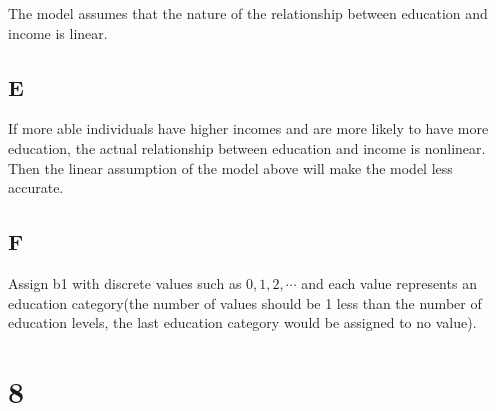 \documentclass{article}
\begin{document}
The model assumes that the nature of the relationship
between education and income is linear.

\subsection*{E}

If more able individuals have higher incomes and are more likely
to have more education, the actual relationship between education and income is nonlinear. Then the linear assumption of the model above will make the model less accurate.

\subsection*{F}

Assign b1 with discrete values such as $0,1,2,\cdots$ and each value represents an education category(the number of values should be 1 less than the number of education levels, the last education category would be assigned to no value).

\section*{8}
\end{document}
